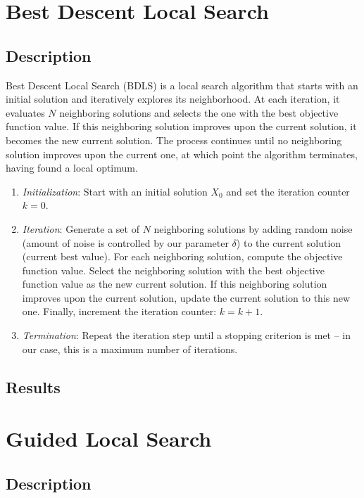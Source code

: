 \documentclass{article}
\begin{document}
\section{Best Descent Local Search}

\subsection{Description}

Best Descent Local Search (BDLS) is a local search algorithm that
starts with an initial solution and iteratively explores its
neighborhood. At each iteration, it evaluates $N$ neighboring solutions
and selects the one with the best objective function value. If this
neighboring solution improves upon the current solution, it becomes the
new current solution. The process continues until no neighboring
solution improves upon the current one, at which point the algorithm
terminates, having found a local optimum.

\begin{enumerate}
  \item \textit{Initialization}: Start with an initial solution $X_0$
    and set the iteration counter $k = 0$.
  \item \textit{Iteration}: Generate a set of $N$ neighboring solutions
    by adding random noise (amount of noise is controlled by our
    parameter $\delta$) to the current solution (current best value). For each
    neighboring solution, compute the objective function value. Select
    the neighboring solution with the best objective function value
    as the new current solution. If this neighboring solution improves
    upon the current solution, update the current solution to this new
    one. Finally, increment the iteration counter: $k = k + 1$.
  \item \textit{Termination}: Repeat the iteration step until a
    stopping criterion is met -- in our case, this is a maximum number
    of iterations.
\end{enumerate}

\subsection{Results}

\section{Guided Local Search}

\subsection{Description}
\end{document}
